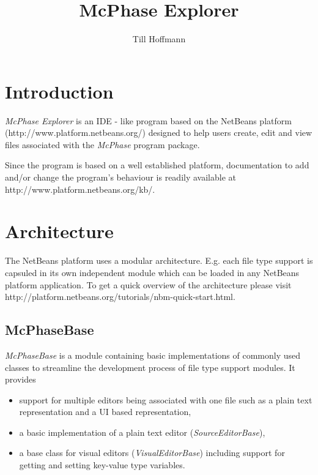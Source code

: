 \documentclass[11pt]{article}
\begin{document}
\title{McPhase Explorer}
\author{Till Hoffmann}
\maketitle

\section{Introduction}
\emph{McPhase Explorer} is an IDE - like program based on the NetBeans platform (http://www.platform.netbeans.org/) designed to help users create, edit and view files associated with the \emph{McPhase} program package.

Since the program is based on a well established platform, documentation to add and/or change the program's behaviour is readily available at http://www.platform.netbeans.org/kb/.

\section{Architecture}
The NetBeans platform uses a modular architecture. E.g. each file type support is capsuled in its own independent module which can be loaded in any NetBeans platform application. To get a quick overview of the architecture please visit http://platform.netbeans.org/tutorials/nbm-quick-start.html.

\subsection{McPhaseBase}
\emph{McPhaseBase} is a module containing basic implementations of commonly used classes to streamline the development process of file type support modules. It provides
\begin{itemize}
\item support for multiple editors being associated with one file such as a plain text representation and a UI based representation,
\item a basic implementation of a plain text editor (\emph{SourceEditorBase}),
\item a base class for visual editors (\emph{VisualEditorBase}) including support for getting and setting key-value type variables.
\end{itemize}
\end{document}
